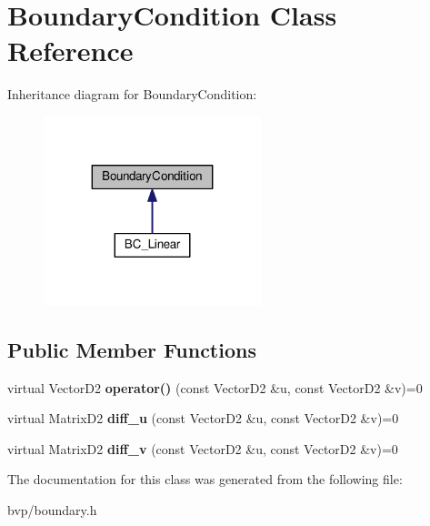 \hypertarget{classBoundaryCondition}{}\section{Boundary\+Condition Class Reference}
\label{classBoundaryCondition}


Inheritance diagram for Boundary\+Condition\+:\nopagebreak
\begin{figure}[H]
\begin{center}
\leavevmode
\includegraphics[width=179pt]{classBoundaryCondition__inherit__graph}
\end{center}
\end{figure}
\subsection*{Public Member Functions}
\begin{DoxyCompactItemize}
\item 
\mbox{\label{classBoundaryCondition_aca60bc8b1f7d06912f82680479bd1d08}} 
virtual Vector\+D2 {\bfseries operator()} (const Vector\+D2 \&u, const Vector\+D2 \&v)=0
\item 
\mbox{\label{classBoundaryCondition_ac228bf957db9c75942e824d33ffce226}} 
virtual Matrix\+D2 {\bfseries diff\+\_\+u} (const Vector\+D2 \&u, const Vector\+D2 \&v)=0
\item 
\mbox{\label{classBoundaryCondition_aea4dd11efed142ce9bfc5ba71c15a1c7}} 
virtual Matrix\+D2 {\bfseries diff\+\_\+v} (const Vector\+D2 \&u, const Vector\+D2 \&v)=0
\end{DoxyCompactItemize}


The documentation for this class was generated from the following file\+:\begin{DoxyCompactItemize}
\item 
bvp/boundary.\+h\end{DoxyCompactItemize}
